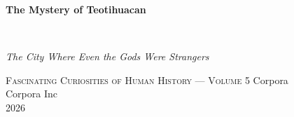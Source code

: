 \clearpage
\vspace*{1.5in}
\begin{center}
  \begin{minipage}{\textwidth}
    \centering
    \Huge\bfseries
    \linespread{1.25}\selectfont
    The Mystery of Teotihuacan
  \end{minipage}
  \\[3em]
  {\Large\itshape\linespread{1.3}\selectfont
  The City Where Even the Gods Were Strangers\par}
  \vspace{2em}
  {\small\scshape Fascinating Curiosities of Human History — Volume 5}
  \vfill
  {\large Corpora}
  \\[1em]
  {\large Corpora Inc}
  \\[1em]
  {\large 2026}
\end{center}
\clearpage
